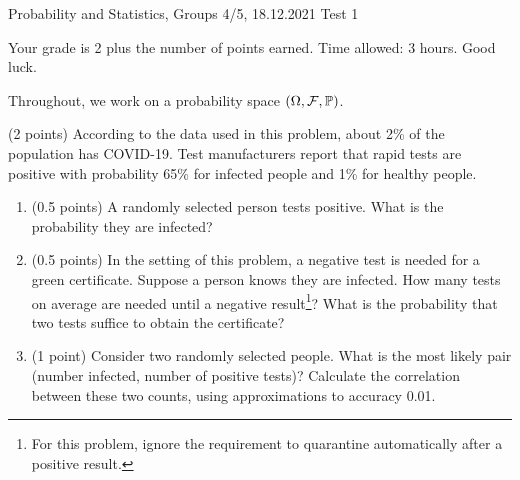 \documentclass[a4paper]{report}
\begin{document}
\noindent Probability and Statistics, Groups 4/5, 18.12.2021 \hfill Test 1

\hrulefill

\begin{it}
Your grade is 2 plus the number of points earned. Time allowed: 3 hours. Good luck.

Throughout, we work on a probability space $(\Omega, {\mathcal{F}}, \mathbb P)$.

\end{it}

\begin{problem} (2 points)
According to the data used in this problem, about 2\% of the population has COVID-19. Test manufacturers
report that rapid tests are positive with probability 65\% for infected people and 1\%
for healthy people.

\begin{enumerate}
    \item (0.5 points) A randomly selected person tests positive. What is the probability they are infected?



    \item (0.5 points) In the setting of this problem, a negative test is needed for a green certificate. Suppose a person knows they are infected. How many tests on average are needed until a negative result\footnote{For this problem, ignore the requirement to quarantine automatically after a positive result.}? What is the probability that two tests suffice to obtain the certificate?

\item (1 point) Consider two randomly selected people. What is the most likely pair (number infected, number of positive tests)? Calculate the correlation between
    these two counts, using approximations to accuracy 0.01.
\end{enumerate}

\end{problem}
\end{document}
